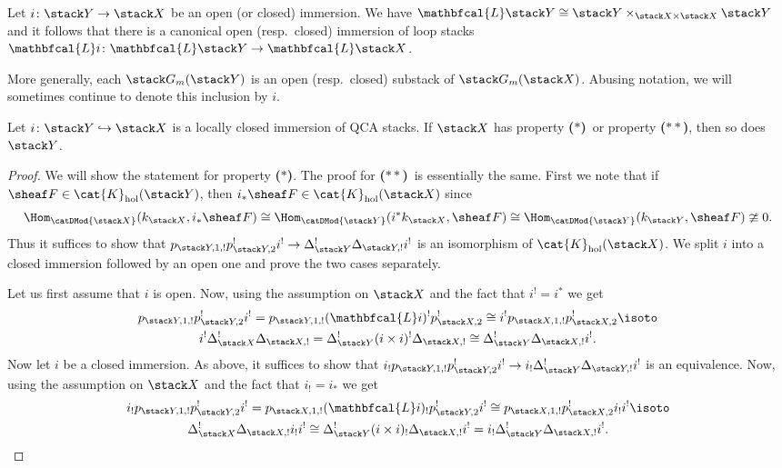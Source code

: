 \documentclass{ck-article}
\newcommand\bc{\textbf{($\mathbf{*}$)}}
\newcommand\hbc{\textbf{($\mathbf{**}$)}}
\newcommand\catK[2][]{\cat{K}_{#1}(#2)}
\newcommand\catKHol[1]{\catK[\mathrm{hol}]{#1}}
\renewcommand\ls[1]{\mathbfcal{L} #1}
\begin{document}
Let $i\colon\stack Y \to \stack X$ be an open (or closed) immersion.
We have $\ls \stack Y \cong \stack Y \times_{\stack X \times \stack X} \stack Y$ and it follows that there is a canonical open (resp.~closed) immersion of loop stacks $\ls i\colon \ls \stack Y \to \ls \stack X$.

More generally, each $\stack G_m(\stack Y)$ is an open (resp.~closed) substack of $\stack G_m(\stack X)$.
Abusing notation, we will sometimes continue to denote this inclusion by $i$.

\begin{Lem}\label{lem:lc_immersion}
    Let $i\colon\stack Y \hookrightarrow \stack X$ is a locally closed immersion of QCA stacks.
    If $\stack X$ has property \bc\ or property \hbc, then so does $\stack Y$.
\end{Lem}

\begin{proof}
    We will show the statement for property \bc.
    The proof for \hbc\ is essentially the same.
    First we note that if $\sheaf F \in \catKHol{\stack Y}$, then $i_*\sheaf F \in \catKHol{\stack X}$ since
    \[
      \Hom_{\catDMod{\stack X}}(k_{\stack X}, i_*\sheaf F) \cong
      \Hom_{\catDMod{\stack Y}}(i^*k_{\stack X}, \sheaf F) \cong
      \Hom_{\catDMod{\stack Y}}(k_{\stack Y}, \sheaf F) \ncong 0.
    \]
    Thus it suffices to show that $p_{\stack Y,1,!}p_{\stack Y,2}^!i^! \to \Delta_{\stack Y}^!\Delta_{\stack Y,!}i^!$ is an isomorphism of $\catKHol{\stack X}$.
    We split $i$ into a closed immersion followed by an open one and prove the two cases separately.

    Let us first assume that $i$ is open.
    Now, using the assumption on $\stack X$ and the fact that $i^! = i^*$ we get
    \begin{multline*}
        p_{\stack Y,1,!} p_{\stack Y,2}^!i^! =
        p_{\stack Y,1,!} (\ls i)^! p_{\stack X,2}^! \cong
        i^! p_{\stack X,1,!} p_{\stack X,2}^! \isoto \\
        i^! \Delta_{\stack X}^! \Delta_{\stack X,!} =
        \Delta_{\stack Y}^! (i\times i)^! \Delta_{\stack X,!} \cong
        \Delta_{\stack Y}^! \Delta_{\stack X,!} i^!.
    \end{multline*}
    Now let $i$ be a closed immersion.
    As above, it suffices to show that $i_!p_{\stack Y,1,!}p_{\stack Y,2}^!i^! \to i_!\Delta_{\stack Y}^!\Delta_{\stack Y,!}i^!$ is an equivalence.
    Now, using the assumption on $\stack X$ and the fact that $i_! = i_*$ we get
    \begin{multline*}
        i_! p_{\stack Y,1,!} p_{\stack Y,2}^!i^! =
        p_{\stack X,1,!} (\ls i)_! p_{\stack Y,2}^!i^! \cong
        p_{\stack X,1,!} p_{\stack X,2}^! i_!i^! \isoto \\
        \Delta_{\stack X}^! \Delta_{\stack X,!} i_!i^! \cong
        \Delta_{\stack Y}^! (i\times i)_! \Delta_{\stack X,!}i^! =
        i_! \Delta_{\stack Y}^! \Delta_{\stack X,!} i^!.
        \qedhere
    \end{multline*}
\end{proof}
\end{document}
